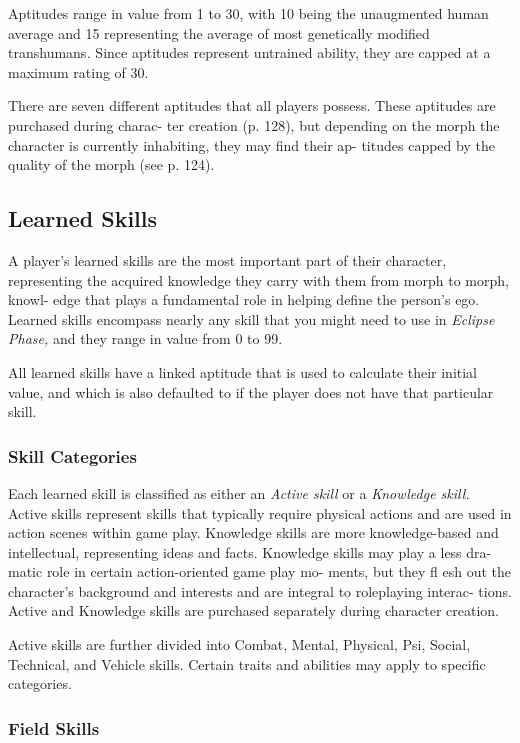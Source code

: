 Aptitudes range in value from 1 to 30, with 10 being 
the unaugmented human average and 15 representing 
the average of most genetically modified transhumans\textit{.}
Since aptitudes represent untrained ability, they are 
capped at a maximum rating of 30.

There are seven different aptitudes that all players 
possess. These aptitudes are purchased during charac-
ter creation (p. 128), but depending on the morph the 
character is currently inhabiting, they may find their ap-
titudes capped by the quality of the morph (see p. 124).

\subsection{Learned Skills}

A player's learned skills are the most important part of 
their character, representing the acquired knowledge 
they carry with them from morph to morph, knowl-
edge that plays a fundamental role in helping define 
the person's ego. Learned skills encompass nearly any 
skill that you might need to use in \textit{Eclipse Phase,} and 
they range in value from 0 to 99.

All learned skills have a linked aptitude that is 
used to calculate their initial value, and which is 
also defaulted to if the player does not have that 
particular skill.

\subsubsection{Skill Categories}

Each learned skill is classified as either an \textit{Active skill}
or a \textit{Knowledge skill.} Active skills represent skills 
that typically require physical actions and are used in 
action scenes within game play. Knowledge skills are 
more knowledge-based and intellectual, representing 
ideas and facts. Knowledge skills may play a less dra-
matic role in certain action-oriented game play mo-
ments, but they fl esh out the character's background 
and interests and are integral to roleplaying interac-
tions. Active and Knowledge skills are purchased 
separately during character creation.

Active skills are further divided into Combat, 
Mental, Physical, Psi, Social, Technical, and Vehicle 
skills. Certain traits and abilities may apply to specific 
categories.

\subsubsection{Field Skills}

